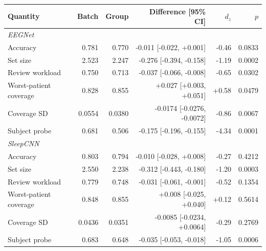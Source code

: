 \begin{tabular}{lrrrrr}
\toprule
Quantity & Batch & Group & Difference [95\% CI] & $d_z$ & $p$ \\
\midrule
\multicolumn{6}{l}{\emph{EEGNet}}\\
Accuracy & 0.781 & 0.770 & -0.011 [-0.022, +0.001] & -0.46 & 0.0833 \\
Set size & 2.523 & 2.247 & -0.276 [-0.394, -0.158] & -1.19 & 0.0002 \\
Review workload & 0.750 & 0.713 & -0.037 [-0.066, -0.008] & -0.65 & 0.0302 \\
Worst-patient coverage & 0.828 & 0.855 & +0.027 [+0.003, +0.051] & +0.58 & 0.0479 \\
Coverage SD & 0.0554 & 0.0380 & -0.0174 [-0.0276, -0.0072] & -0.86 & 0.0067 \\
Subject probe & 0.681 & 0.506 & -0.175 [-0.196, -0.155] & -4.34 & 0.0001 \\
\midrule
\multicolumn{6}{l}{\emph{SleepCNN}}\\
Accuracy & 0.803 & 0.794 & -0.010 [-0.028, +0.008] & -0.27 & 0.4212 \\
Set size & 2.550 & 2.238 & -0.312 [-0.443, -0.180] & -1.20 & 0.0003 \\
Review workload & 0.779 & 0.748 & -0.031 [-0.061, -0.001] & -0.52 & 0.1354 \\
Worst-patient coverage & 0.848 & 0.855 & +0.008 [-0.025, +0.040] & +0.12 & 0.5614 \\
Coverage SD & 0.0436 & 0.0351 & -0.0085 [-0.0234, +0.0064] & -0.29 & 0.2769 \\
Subject probe & 0.683 & 0.648 & -0.035 [-0.053, -0.018] & -1.05 & 0.0006 \\
\bottomrule
\end{tabular}